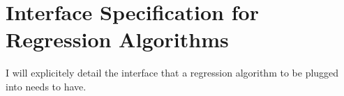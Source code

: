 \chapter{Interface Specification for Regression Algorithms}
\thispagestyle{plain}

\label{RegressionInterface}

I will explicitely detail the interface that a regression algorithm to be plugged into \fw needs to have.

